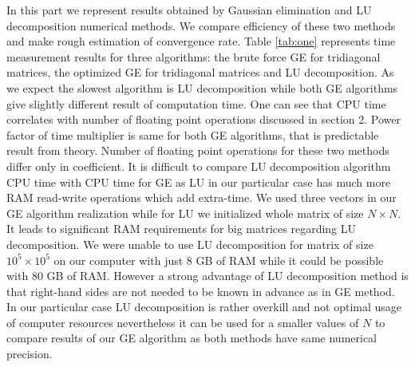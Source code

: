 \documentclass[10pt]{article}
\begin{document}
In this part we represent results obtained by Gaussian elimination and LU decomposition numerical methods. We compare efficiency of these two methods and make rough estimation of convergence rate.
Table \ref{tab:one} represents time measurement results for three algorithms: the brute force GE for tridiagonal matrices, the optimized GE for tridiagonal matrices and LU decomposition. As we expect the slowest algorithm is LU decomposition while both GE algorithms give slightly different result of computation time. One can see that CPU time correlates with number of floating point operations discussed in section 2. Power factor of time multiplier is same for both GE algorithms, that is predictable result from theory. Number of floating point operations for these two methods differ only in coefficient. It is difficult to compare LU decomposition algorithm CPU time with CPU time for GE as LU in our particular case has much more RAM read-write operations which add extra-time. We used three vectors in our GE algorithm realization while for LU we initialized whole matrix of size $N \times N$. It leads to significant RAM requirements for big matrices regarding LU decomposition. We were unable to use LU decomposition for matrix of size $10^5 \times 10^5$ on our computer with just 8 GB of RAM while it could be possible with 80 GB of RAM. However a strong advantage of LU decomposition method is that right-hand sides are not needed to be known in advance as in GE method.
In our particular case LU decomposition is rather overkill and not optimal usage of computer resources nevertheless it can be used for a smaller values of $N$ to compare results of our GE algorithm as both methods have same numerical precision.
\end{document}
